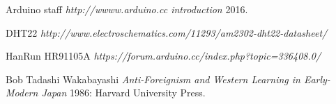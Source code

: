   \begin{thebibliography}{1}

   Arduino staff {\em http://wwww.arduino.cc introduction}  	  2016.

    DHT22 {\em http://www.electroschematics.com/11293/am2302-dht22-datasheet/}

   HanRun HR91105A {\em https://forum.arduino.cc/index.php?topic=336408.0/}

   Bob Tadashi Wakabayashi {\em Anti-Foreignism and Western
  Learning in Early-Modern Japan} 1986: Harvard University Press.

  \end{thebibliography}
